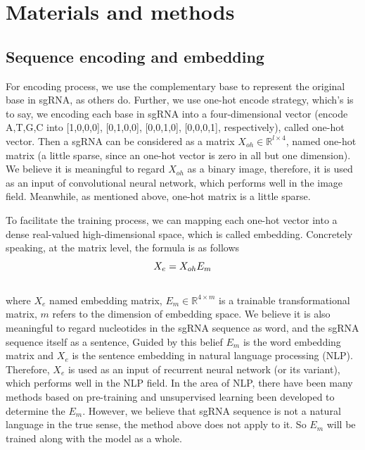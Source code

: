 \documentclass{bioinfo}
\begin{document}
\section{Materials and methods}

\subsection{Sequence encoding and embedding}

For encoding process, we use the complementary base to represent the original base in sgRNA, as others do. 
Further, we use one-hot encode strategy, which's is to say, we encoding each base in sgRNA into a four-dimensional vector 
(encode A,T,G,C into [1,0,0,0], [0,1,0,0], [0,0,1,0], [0,0,0,1], respectively), called one-hot vector. 
Then a sgRNA can be considered as a matrix $X_{oh}\in\mathbb{R}^{l\times4} $, named one-hot matrix (a little sparse, since an one-hot vector is zero in all but one dimension). 
We believe it is meaningful to regard $X_{oh}$ as a binary image, 
therefore, it is used as an input of convolutional neural network, which performs well in the image field.
Meanwhile, as mentioned above, one-hot matrix is a little sparse. 

To facilitate the training process, we can mapping each one-hot vector into a dense real-valued high-dimensional space, which is called embedding. 
Concretely speaking, at the matrix level, the formula is as follows
\begin{equation}
X_e=X_{oh}E_m\label{eq:08}\vspace*{-10pt}
\end{equation}\\
where $X_e$ named embedding matrix, $E_m\in\mathbb{R}^{4\times m}$ is a trainable transformational matrix, $m$ refers to the dimension of embedding space. 
We believe it is also meaningful to regard nucleotides in the sgRNA sequence as word, and the sgRNA sequence itself as a sentence, 
Guided by this belief $E_m$ is the word embedding matrix and $X_e$ is the sentence embedding in natural language processing (NLP).
Therefore, $X_e$ is used as an input of recurrent neural network (or its variant), which performs well in the NLP field.
In the area of NLP, there have been many methods based on pre-training and unsupervised learning been developed to determine the $E_m$. 
However, we believe that sgRNA sequence is not a natural language in the true sense, the method above does not apply to it. 
So $E_m$ will be trained along with the model as a whole. 
\end{document}
